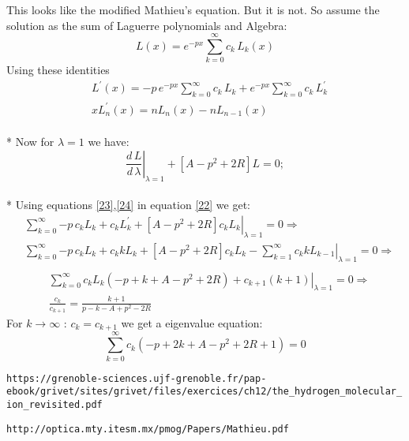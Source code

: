 \documentclass[11pt, oneside]{article}   	%
\begin{document}
This looks like the modified Mathieu's equation. But it is not. So assume the solution as the sum of Laguerre polynomials and Algebra:
\begin{equation}
L(x) =  e^{-px}\sum_{k=0}^{\infty}{ c_k\,L_k(x) } \label{22}
\end{equation}
Using these identities
\begin{equation}
\begin{split}
& L^{'}(x) =  -p\,e^{-px}\sum_{k=0}^{\infty}{c_k\,L_k} + e^{-px}\sum_{k=0}^{\infty}{c_k\,L_k^{'}} \\[.8em]  \label{24}
& xL_n^{'}(x) = n L_n(x) - n L_{n-1}(x) 
\end{split} 
\end{equation}\\*
Now for $ \lambda = 1 $ we have:
\begin{equation}
\left.\frac{d\,L}{d\,\lambda}\right|_{\lambda=1} + \left[ A - p^2 + 2R  \right] L = 0;
\end{equation}\\*
Using equations \eqref{23},\eqref{24} in equation \eqref{22} we get:
\begin{equation}
\begin{split}
& \sum_{k=0}^{\infty}\left.{- p\,c_k L_k  + c_k  L_k^{'} + \left[ A - p^2 + 2R  \right] c_kL_k  }\right|_{\lambda =1} = 0  \Rightarrow \\[.7em]
&  \sum_{k=0}^{\infty}\left.{- p\,c_k L_k  +  c_k k L_k  +  \left[ A - p^2 + 2R  \right] c_kL_k  } -  \sum_{k=1}^{\infty} c_kk L_{k-1}\right|_{\lambda =1} = 0   \Rightarrow \\[.7em]
\end{split}
\end{equation}
\begin{equation}
\begin{split}
& \sum_{k=0}^{\infty}\left.{ c_k L_k \left( -p + k + A - p^2 + 2R \right) + c_{k+1}(k+1) }\right|_{\lambda =1} = 0  \Rightarrow \\[.8em]
& \frac{c_k}{c_{k+1}} = \frac{k + 1}{p - k - A + p^2  - 2R }
\end{split}
\end{equation}
For $ k \rightarrow \infty $ : $ c_k = c_{k+1} $ we get a eigenvalue equation:
\begin{equation}
 \sum_{k=0}^{\infty}{c_k( -p + 2k + A - p^2 + 2R + 1 ) } = 0
\end{equation}

\verb+https://grenoble-sciences.ujf-grenoble.fr/pap-ebook/grivet/sites/grivet/files/exercices/ch12/the_hydrogen_molecular_ion_revisited.pdf+

\verb+http://optica.mty.itesm.mx/pmog/Papers/Mathieu.pdf+
\end{document}
